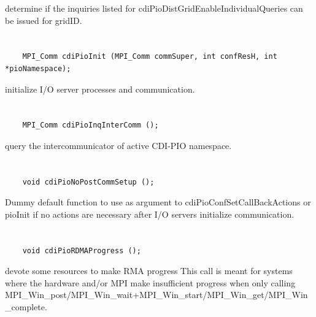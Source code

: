 determine if the inquiries
listed for cdiPioDistGridEnableIndividualQueries can be issued for
gridID.


\section*{\tt {}}

\begin{verbatim}
    MPI_Comm cdiPioInit (MPI_Comm commSuper, int confResH, int *pioNamespace);
\end{verbatim}

initialize I/O server processes and communication.


\section*{\tt {}}

\begin{verbatim}
    MPI_Comm cdiPioInqInterComm ();
\end{verbatim}

query the intercommunicator of active CDI-PIO
namespace.


\section*{\tt {}}

\begin{verbatim}
    void cdiPioNoPostCommSetup ();
\end{verbatim}

Dummy default function to use as argument to
cdiPioConfSetCallBackActions or pioInit
if no actions are necessary after I/O servers initialize communication.


\section*{\tt {}}

\begin{verbatim}
    void cdiPioRDMAProgress ();
\end{verbatim}

devote some resources to make RMA progress This
call is meant for systems where the hardware and/or MPI make
insufficient progress when only calling
MPI_Win_post/MPI_Win_wait+MPI_Win_start/MPI_Win_get/MPI_Win_complete.



